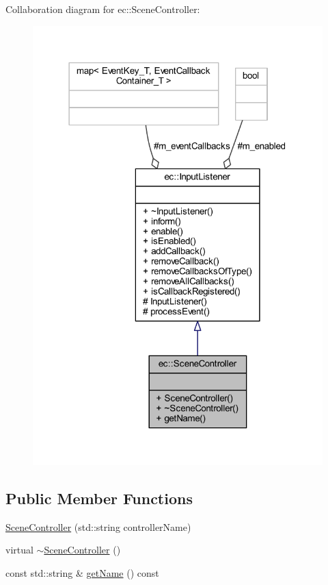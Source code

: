 Collaboration diagram for ec\+:\+:Scene\+Controller\+:\nopagebreak
\begin{figure}[H]
\begin{center}
\leavevmode
\includegraphics[width=318pt]{classec_1_1_scene_controller__coll__graph}
\end{center}
\end{figure}
\subsection*{Public Member Functions}
\begin{DoxyCompactItemize}
\item 
\mbox{\hyperlink{classec_1_1_scene_controller_a97313b71165471f26f6e1bdec16392fd}{Scene\+Controller}} (std\+::string controller\+Name)
\item 
virtual \mbox{\hyperlink{classec_1_1_scene_controller_a48a2231bf316949cc1a8bc304ad5281c}{$\sim$\+Scene\+Controller}} ()
\item 
const std\+::string \& \mbox{\hyperlink{classec_1_1_scene_controller_af45d2fce41110dc9a128b900bde8ba14}{get\+Name}} () const
\end{DoxyCompactItemize}
